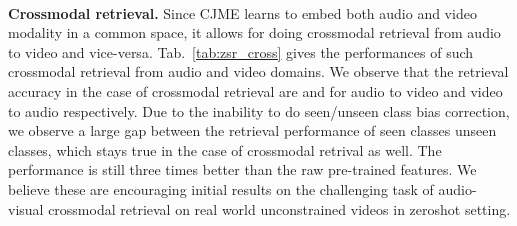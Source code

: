 \begin{table}
\centering
{}
\caption{Zeroshot crossmodal retrieval performances (\% mAP).}
\label{tab:zsr_cross}
\vspace{-1em}
\end{table}
\vspace{0.5em} \\
\textbf{Crossmodal retrieval.}
Since CJME learns to embed both audio and video modality in a common space, it allows for doing crossmodal retrieval from audio to video and vice-versa. Tab.~\ref{tab:zsr_cross} gives the performances of such crossmodal retrieval from audio and video domains. We observe that the retrieval accuracy in the case of crossmodal retrieval are  and  for audio to video and video to audio respectively. Due to the inability to do seen/unseen class bias correction, we observe a large gap between the retrieval performance of seen classes \cf unseen classes, which stays true in the case of crossmodal retrival as well. The performance is still three times better than the raw pre-trained features. We believe these are encouraging initial results on the challenging task of audio-visual crossmodal retrieval on real world unconstrained videos in zeroshot setting.
\begin{table}[t]
 \centering
{}
 \caption{Ablation study to verify the contribution of different loss terms. Performances for proposed CJME (with attention) method on zeroshot classification (\% mAcc)}
 \label{tab:ablation}
 \vspace{-1em}
 \end{table}
